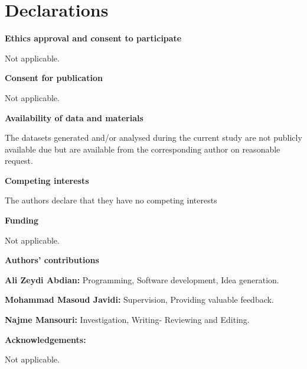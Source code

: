 \documentclass{article}
\begin{document}
\section*{Declarations}

\begin{flushleft}
{\bf Ethics approval and consent to participate}
\end{flushleft}

Not applicable.

\begin{flushleft}
{\bf Consent for publication}
\end{flushleft}

Not applicable.

\begin{flushleft}
{\bf Availability of data and materials}
\end{flushleft}

The datasets generated and/or analysed during the current study are not publicly available due but are available from the corresponding author on reasonable request.

\begin{flushleft}
{\bf Competing interests}
\end{flushleft}

The authors declare that they have no competing interests

\begin{flushleft}
{\bf Funding}
\end{flushleft}

Not applicable.

\begin{flushleft}
{\bf Authors' contributions}
\end{flushleft}

{\bf Ali Zeydi Abdian:} Programming, Software development,  Idea generation.\vspace{2mm}

{\bf Mohammad Masoud Javidi:} Supervision, Providing valuable feedback.\vspace{2mm}


{\bf Najme Mansouri:} Investigation, Writing- Reviewing and Editing.\\



\begin{flushleft}
{\bf Acknowledgements:}
\end{flushleft}

Not applicable.

\newpage
\end{document}
